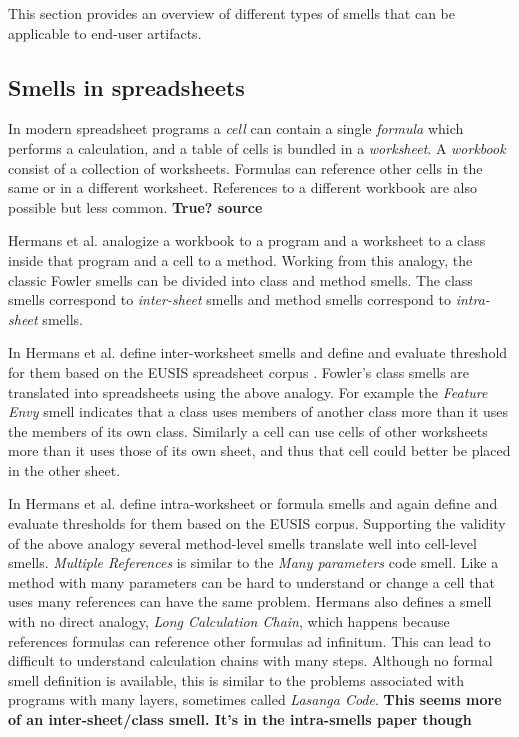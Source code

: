 \documentclass[10pt,conference,compsocconf]{IEEEtran}
\newcommand{\todo}[1]{\textbf{#1}}
\begin{document}
This section provides an overview of different types of smells that can be applicable to end-user artifacts.

\subsection{Smells in spreadsheets}

In modern spreadsheet programs a \textit{cell} can contain a single \textit{formula} which performs a calculation, and a table of cells is bundled in a \textit{worksheet}.
A \textit{workbook} consist of a collection of worksheets.
Formulas can reference other cells in the same or in a different worksheet.
References to a different workbook are also possible but less common. \todo{True? source}
 
Hermans et al. \cite{Hermans2012inter} \cite{Hermans2012intra} analogize a workbook to a program and a worksheet to a class inside that program and a cell to a method.
Working from this analogy, the classic Fowler smells can be divided into class and method smells.
The class smells correspond to \textit{inter-sheet} smells and method smells correspond to \textit{intra-sheet} smells.

In \cite{Hermans2012inter} Hermans et al. define inter-worksheet smells and define and evaluate threshold for them based on the EUSIS spreadsheet corpus \cite{fisher2005euses}.
Fowler's class smells are translated into spreadsheets using the above analogy. 
For example the \textit{Feature Envy} smell indicates that a class uses members of another class more than it uses the members of its own class.
Similarly a cell can use cells of other worksheets more than it uses those of its own sheet, and thus that cell could better be placed in the other sheet.

In \cite{Hermans2012intra} Hermans et al. define intra-worksheet or formula smells and again define and evaluate thresholds for them based on the EUSIS corpus.
Supporting the validity of the above analogy several method-level smells translate well into cell-level smells.
\textit{Multiple References} is similar to the \textit{Many parameters} code smell. Like a method with many parameters can be hard to understand or change a cell that uses many references can have the same problem.
Hermans also defines a smell with no direct analogy, \textit{Long Calculation Chain}, which happens because references formulas can reference other formulas ad infinitum.
This can lead to difficult to understand calculation chains with many steps.
Although no formal smell definition is available, this is similar to the problems associated with programs with many layers, sometimes called \textit{Lasanga Code}.
\todo{This seems more of an inter-sheet/class smell. It's in the intra-smells paper though}
\end{document}
